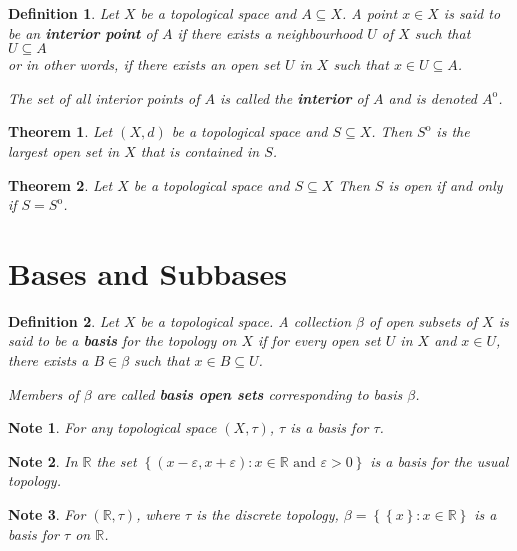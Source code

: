 \documentclass[12pt,twoside]{report}
\newtheorem{defn}{Definition}
\newtheorem{note}{Note}
\newtheorem{thm}{Theorem}
\begin{document}
\begin{defn}
Let $X$ be a topological space and $A \subseteq X$. A point $x \in X$ is said to be an \textbf{interior point} of $A$ if there exists a neighbourhood $U$ of $X$ such that $U \subseteq A$\\ or in other words, if there exists an open set $U$ in $X$ such that $x \in U \subseteq A$. 

The set of all interior points of $A$ is called the \textbf{interior} of $A$ and is denoted $A^\mathrm{o}$.
\end{defn}

\begin{thm}
    Let $\left (X, d\right )$ be a topological space and $S \subseteq X$. Then $S^\mathrm{o}$ is the largest open set in $X$ that is contained in $S$.
\end{thm}

\begin{thm}
    Let $X$ be a topological space and $S \subseteq X$ Then $S$ is open if and only if $S = S^\mathrm{o}$.
\end{thm}

\section{Bases and Subbases}

\begin{defn}
    Let $X$ be a topological space. A collection $\beta$ of open subsets of $X$ is said to be a \textbf{basis} for the topology on $X$ if for every open set $U$ in $X$ and $x \in U$, there exists a $B \in \beta$ such that $x \in B \subseteq U$.

    Members of $\beta$ are called \textbf{basis open sets} corresponding to basis $\beta$.
\end{defn}

\begin{note}
    For any topological space $\left (X, \tau\right )$, $\tau$ is a basis for $\tau$.
\end{note}

\begin{note}
    In $\mathbb{R}$ the set $\left\{ \left (x - \varepsilon, x + \varepsilon\right )  :  x \in \mathbb{R}\text{ and }\varepsilon >0 \right\}$ is a basis for the usual topology.
\end{note}

\begin{note}
    For $\left (\mathbb{R}, \tau\right )$, where $\tau$ is the discrete topology, $\beta = \left\{ \left\{ x \right\}  :  x \in \mathbb{R} \right\}$ is a basis for $\tau$ on $\mathbb{R}$.
\end{note}
\end{document}
